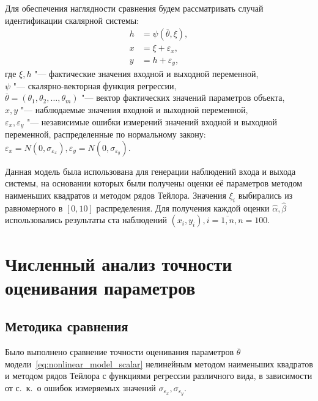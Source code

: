 Для обеспечения наглядности сравнения будем рассматривать случай
идентификации скалярной системы:
\begin{equation}
  \label{eq:nonlinear_model_scalar}
  \begin{aligned}
    h &= \psi(\overline{\theta}, \xi), \\
    x &= \xi + \varepsilon_x, \\
    y &= h + \varepsilon_y,
  \end{aligned}
\end{equation}
где \( \xi, h \) "--- фактические значения входной и выходной переменной, \\
\hspace*{7mm} \( \psi \) "--- скалярно-векторная функция регрессии, \\
\hspace*{7mm} \( \overline{\theta} = (\theta_1, \theta_2, \dotsc, \theta_m) \)
"--- вектор фактических значений параметров объекта, \\
\hspace*{7mm} \( x, y \) "--- наблюдаемые значения входной и выходной переменной, \\
\hspace*{6mm} \( \varepsilon_x, \varepsilon_y \)
"--- независимые ошибки измерений значений входной и выходной переменной,
распределенные по нормальному закону:
\(
\varepsilon_x = N(0, \sigma_{\varepsilon_x}),
\varepsilon_y = N(0, \sigma_{\varepsilon_y})
\).

Данная модель была использована для генерации наблюдений входа и выхода системы,
на основании которых были получены оценки её параметров
методом наименьших квадратов и методом рядов Тейлора.
Значения \( \xi_i \) выбирались из равномерного в \( [0, 10] \) распределения.
Для получения каждой оценки \( \hat{\alpha}, \hat{\beta} \) использовались результаты
ста наблюдений \( ( x_i, y_i ), i = \overline{1, n}, n = 100 \).

\section{Численный анализ точности оценивания параметров}

\subsection{Методика сравнения}\label{subsec:nonlinear_comparison_conditions}

Было выполнено сравнение точности оценивания параметров \( \overline{\theta} \)
модели~\eqref{eq:nonlinear_model_scalar}
нелинейным методом наименьших квадратов и методом рядов Тейлора
с функциями регрессии различного вида,
в зависимости от с.~к.~о ошибок измеряемых значений
\( \sigma_{\varepsilon_x}, \sigma_{\varepsilon_y} \).

